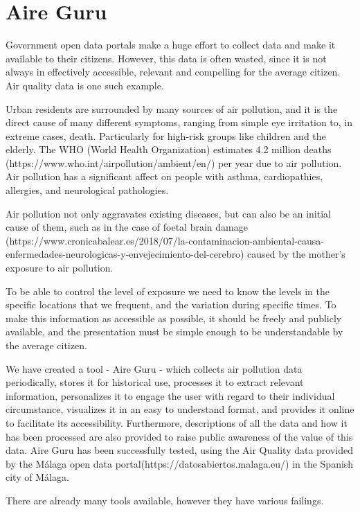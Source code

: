 \newpage
\section{Aire Guru}

Government open data portals make a huge effort to collect data and make it available to their citizens.
However, this data is often wasted, since it is not always in effectively accessible, relevant and compelling
for the average citizen. Air quality data is one such example.

Urban residents are surrounded by many sources of air pollution, and it is the direct cause of many different symptoms,
ranging from simple eye irritation 
to, in extreme cases, death. Particularly for high-risk groups like children and the elderly.
The WHO (World Health Organization) estimates 4.2 million deaths
(https://www.who.int/airpollution/ambient/en/) per year due to air pollution.
Air pollution has a significant affect on people with asthma, cardiopathies, allergies, and neurological pathologies.

Air pollution not only aggravates existing diseases, but can also be an initial cause of them, such as in the case of foetal brain
damage (https://www.cronicabalear.es/2018/07/la-contaminacion-ambiental-causa-enfermedades-neurologicas-y-envejecimiento-del-cerebro)
caused by the mother's exposure to air pollution.

To be able to control the level of exposure we need to know the levels
in the specific locations that we frequent, and the variation during specific times.
To make this information as accessible as possible, it should be freely and publicly available, and the presentation
must be simple enough to be understandable by the average citizen.

We have created a tool - Aire Guru - which collects air pollution data periodically, stores it for historical use, 
processes it to extract relevant information, personalizes it to engage the user with regard to their individual
circumstance, visualizes it in an easy to understand format, and provides it online to facilitate its accessibility. Furthermore,
descriptions of all the data and how it has been processed are also provided to raise public awareness of the value
of this data. Aire Guru has been successfully tested, using the Air Quality data provided
by the Málaga open data portal(https://datosabiertos.malaga.eu/) in the Spanish city of Málaga.

There are already many tools available, however they have various failings.

